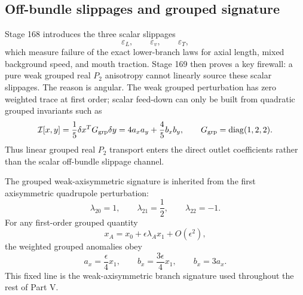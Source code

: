 \subsection{Off-bundle slippages and grouped signature}
Stage 168 introduces the three scalar slippages
\begin{equation}
\label{eq:part05-slippage-names}
\varepsilon_L,
\qquad
\varepsilon_v,
\qquad
\varepsilon_T,
\end{equation}
which measure failure of the exact lower-branch laws for axial length, mixed background speed, and mouth traction.  Stage 169 then proves a key firewall: a pure weak grouped real \(P_2\) anisotropy cannot linearly source these scalar slippages.  The reason is angular.  The weak grouped perturbation has zero weighted trace at first order; scalar feed-down can only be built from quadratic grouped invariants such as
\begin{equation}
\label{eq:part05-grouped-invariant}
\mathcal I[x,y]
=
\frac15\delta x^T G_{\rm grp}\delta y
=
4a_xa_y+\frac45 b_xb_y,
\qquad
G_{\rm grp}=\operatorname{diag}(1,2,2).
\end{equation}
Thus linear grouped real \(P_2\) transport enters the direct outlet coefficients rather than the scalar off-bundle slippage channel.

The grouped weak-axisymmetric signature is inherited from the first axisymmetric quadrupole perturbation:
\begin{equation}
\label{eq:part05-weak-axisymmetric-signature}
\lambda_{20}=1,
\qquad
\lambda_{21}=\frac12,
\qquad
\lambda_{22}=-1.
\end{equation}
For any first-order grouped quantity
\begin{equation}
\label{eq:part05-lambda-expansion-general}
x_A=x_0+\epsilon\lambda_Ax_1+O(\epsilon^2),
\end{equation}
the weighted grouped anomalies obey
\begin{equation}
\label{eq:part05-b-equals-3a-general}
a_x=\frac{\epsilon}{4}x_1,
\qquad
b_x=\frac{3\epsilon}{4}x_1,
\qquad
b_x=3a_x.
\end{equation}
This fixed line is the weak-axisymmetric branch signature used throughout the rest of Part V.


